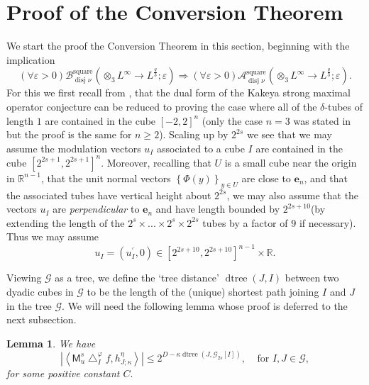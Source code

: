 \documentclass{amsart}%
\theoremstyle{plain}
\newtheorem{lemma}[theorem]{Lemma}
\numberwithin{equation}{section}
\begin{document}
\section{Proof of the Conversion Theorem}

We start the proof the Conversion Theorem in this section, beginning with the
implication
\[
\left(  \forall\varepsilon>0\right)  \mathcal{B}_{\operatorname*{disj}\nu
}^{\operatorname*{square}}\left(  \otimes_{3}L^{\infty}\rightarrow L^{\frac
{q}{3}};\varepsilon\right)  \Longrightarrow\left(  \forall\varepsilon
>0\right)  \mathcal{A}_{\operatorname*{disj}\nu}^{\operatorname*{square}%
}\left(  \otimes_{3}L^{\infty}\rightarrow L^{\frac{q}{3}};\varepsilon\right)
.
\]
For this we first recall from \cite[Remark 25]{RiSa2}, that the dual form of
the Kakeya strong maximal operator conjecture can be reduced to proving the
case where all of the $\delta$-tubes of length $1$ are contained in the cube
$\left[  -2,2\right]  ^{n}$ (only the case $n=3$ was stated in \cite{RiSa2}
but the proof is the same for $n\geq2$). Scaling up by $2^{2s}$ we see that we
may assume the modulation vectors $u_{I}$ associated to a cube $I $ are
contained in the cube $\left[  2^{2s+1},2^{2s+1}\right]  ^{n}$. Moreover,
recalling that $U$ is a small cube near the origin in $\mathbb{R}^{n-1}$, that
the unit normal vectors $\left\{  \Phi\left(  y\right)  \right\}  _{y\in U}$
are close to $\mathbf{e}_{n}$, and that the associated tubes have vertical
height about $2^{2s}$, we may also assume that the vectors $u_{I}$ are
\emph{perpendicular} to $\mathbf{e}_{n}$ and have length bounded by
$2^{2s+10}$(by extending the length of the $2^{s}\times...\times2^{s}%
\times2^{2s}$ tubes by a factor of $9$ if necessary). Thus we may assume
\begin{equation}
u_{I}=\left(  u_{I}^{\prime},0\right)  \in\left[  2^{2s+10},2^{2s+10}\right]
^{n-1}\times\mathbb{R}.\label{may}%
\end{equation}


Viewing $\mathcal{G}$ as a tree, we define the `tree distance'
$\operatorname*{dtree}\left(  J,I\right)  $ between two dyadic cubes in
$\mathcal{G}$ to be the length of the (unique) shortest path joining $I$ and
$J$ in the tree $\mathcal{G}$. We will need the following lemma whose proof is
deferred to the next subsection.

\begin{lemma}
\label{scales}We have%
\begin{equation}
\left\vert \left\langle \mathsf{M}_{u}^{s}\bigtriangleup_{I}^{\varphi
}f,h_{J;\kappa}^{\eta}\right\rangle \right\vert \leq2^{D-\kappa
\operatorname*{dtree}\left(  J,\mathcal{G}_{2s}\left[  I\right]  \right)
},\ \ \ \ \ \text{for }I,J\in\mathcal{G},\label{scales ineq}%
\end{equation}
for some positive constant $C.$
\end{lemma}
\end{document}
